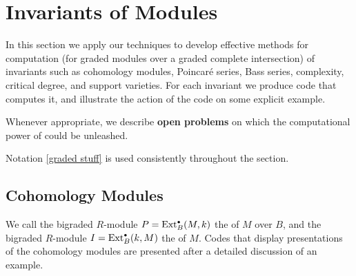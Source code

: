 \section{Invariants of Modules}
\label{Invariants of modules}

In this section we apply our techniques to develop effective methods
for computation (for graded modules over a graded complete
intersection) of invariants such as cohomology modules, Poincar\'e
series, Bass series, complexity, critical degree, and support
varieties.  For each invariant we produce code that computes it, and
illustrate the action of the code on some explicit example.

Whenever appropriate, we describe {\bf open problems} on which the
computational power of \Mtwo could be unleashed.

Notation \ref{graded stuff} is used consistently throughout the section.

\subsection{Cohomology Modules}
\label{Computation of cohomology}

We call the bigraded $R$-module $P=\operatorname{Ext}^{\scriptscriptstyle\bullet}_B(M,k)$ the
{\it{}\/} of $M$ over $B$, and the
bigraded $R$-module $I=\operatorname{Ext}^{\scriptscriptstyle\bullet}_B(k,M)$ the {\it{}\/} of $M$.   Codes that display presentations of the
cohomology modules are presented after a detailed discussion of an example.

